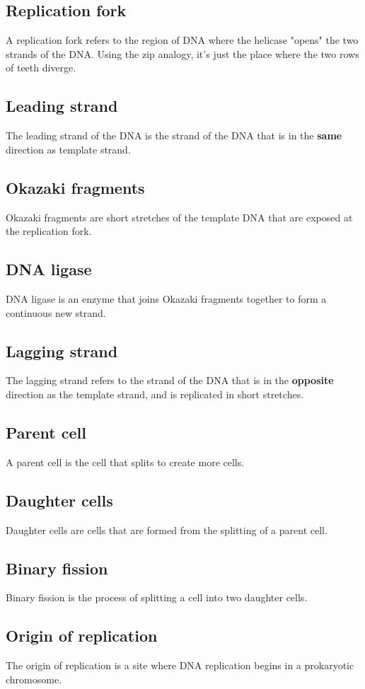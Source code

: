 \documentclass[11pt]{article}
\begin{document}
\subsection{Replication fork}
\label{sec:org50443d7}
A replication fork refers to the region of DNA where the helicase "opens" the two strands of the DNA. Using the zip analogy, it's just the place where the two rows of teeth diverge.
\subsection{Leading strand}
\label{sec:orgb841014}
The leading strand of the DNA is the strand of the DNA that is in the \textbf{same} direction as template strand.
\subsection{Okazaki fragments}
\label{sec:orga546bd3}
Okazaki fragments are short stretches of the template DNA that are exposed at the replication fork.
\subsection{DNA ligase}
\label{sec:org7218833}
DNA ligase is an enzyme that joins Okazaki fragments together to form a continuous new strand.
\subsection{Lagging strand}
\label{sec:org7f299d7}
The lagging strand refers to the strand of the DNA that is in the \textbf{opposite} direction as the template strand, and is replicated in short stretches.
\subsection{Parent cell}
\label{sec:org11b6a06}
A parent cell is the cell that splits to create more cells.
\subsection{Daughter cells}
\label{sec:org5594e8f}
Daughter cells are cells that are formed from the splitting of a parent cell.
\subsection{Binary fission}
\label{sec:orge81a69b}
Binary fission is the process of splitting a cell into two daughter cells.
\subsection{Origin of replication}
\label{sec:orga1bbba6}
The origin of replication is a site where DNA replication begins in a prokaryotic chromosome.
\end{document}
